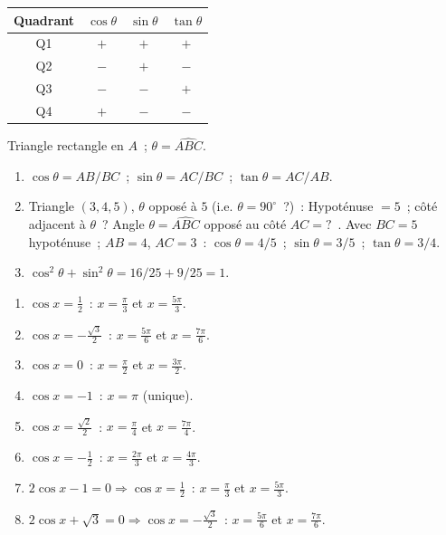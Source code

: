 \begin{center}
\begin{tabular}{|c|c|c|c|}
\hline
Quadrant & $\cos\theta$ & $\sin\theta$ & $\tan\theta$ \\\hline
Q1 & $+$ & $+$ & $+$ \\
Q2 & $-$ & $+$ & $-$ \\
Q3 & $-$ & $-$ & $+$ \\
Q4 & $+$ & $-$ & $-$ \\\hline
\end{tabular}
\end{center}


Triangle rectangle en $A$~; $\theta=\widehat{ABC}$.
\begin{enumerate}
  \item $\cos\theta=AB/BC$~; $\sin\theta=AC/BC$~; $\tan\theta=AC/AB$.
  \item Triangle $(3,4,5)$, $\theta$ oppos\'e \`a $5$ (i.e. $\theta=90^{\circ}$~?)~:
        Hypot\'enuse $=5$~; c\^ot\'e adjacent \`a $\theta$~? 
        Angle $\theta=\widehat{ABC}$ oppos\'e au c\^ot\'e $AC=?$~.
        Avec $BC=5$ hypot\'enuse~; $AB=4$, $AC=3$~:
        $\cos\theta=4/5$~; $\sin\theta=3/5$~; $\tan\theta=3/4$.
  \item $\cos^2\theta+\sin^2\theta=16/25+9/25=1$.\checkmark
\end{enumerate}


\begin{enumerate}
  \item $\cos x=\frac{1}{2}$~: $x=\frac{\pi}{3}$ et $x=\frac{5\pi}{3}$.
  \item $\cos x=-\frac{\sqrt{3}}{2}$~: $x=\frac{5\pi}{6}$ et $x=\frac{7\pi}{6}$.
  \item $\cos x=0$~: $x=\frac{\pi}{2}$ et $x=\frac{3\pi}{2}$.
  \item $\cos x=-1$~: $x=\pi$ (unique).
  \item $\cos x=\frac{\sqrt{2}}{2}$~: $x=\frac{\pi}{4}$ et $x=\frac{7\pi}{4}$.
  \item $\cos x=-\frac{1}{2}$~: $x=\frac{2\pi}{3}$ et $x=\frac{4\pi}{3}$.
  \item $2\cos x-1=0\Rightarrow\cos x=\frac{1}{2}$~: $x=\frac{\pi}{3}$ et $x=\frac{5\pi}{3}$.
  \item $2\cos x+\sqrt{3}=0\Rightarrow\cos x=-\frac{\sqrt{3}}{2}$~: $x=\frac{5\pi}{6}$ et $x=\frac{7\pi}{6}$.
\end{enumerate}

